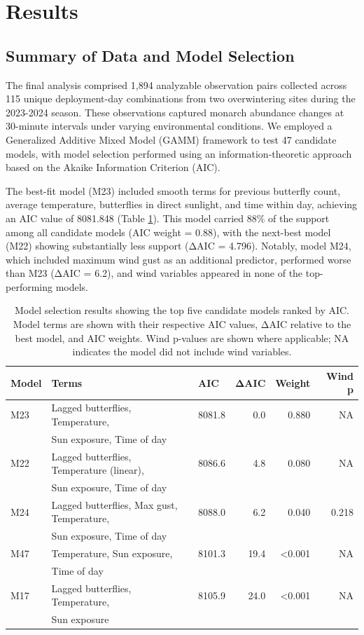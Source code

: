 \section{Results}

\subsection{Summary of Data and Model Selection}

The final analysis comprised 1,894 analyzable observation pairs collected across 115 unique deployment-day combinations from two overwintering sites during the 2023-2024 season. These observations captured monarch abundance changes at 30-minute intervals under varying environmental conditions. We employed a Generalized Additive Mixed Model (GAMM) framework to test 47 candidate models, with model selection performed using an information-theoretic approach based on the Akaike Information Criterion (AIC).

The best-fit model (M23) included smooth terms for previous butterfly count, average temperature, butterflies in direct sunlight, and time within day, achieving an AIC value of 8081.848 (Table \ref{tab:model_selection}). This model carried 88\% of the support among all candidate models (AIC weight = 0.88), with the next-best model (M22) showing substantially less support (ΔAIC = 4.796). Notably, model M24, which included maximum wind gust as an additional predictor, performed worse than M23 (ΔAIC = 6.2), and wind variables appeared in none of the top-performing models.

\begin{table}[htbp]
\centering
\caption{Model selection results showing the top five candidate models ranked by AIC. Model terms are shown with their respective AIC values, ΔAIC relative to the best model, and AIC weights. Wind p-values are shown where applicable; NA indicates the model did not include wind variables.}
\label{tab:model_selection}
\begin{tabular}{lllrrr}
\hline
Model & Terms & AIC & ΔAIC & Weight & Wind p \\
\hline
M23 & Lagged butterflies, Temperature, & 8081.8 & 0.0 & 0.880 & NA \\
    & Sun exposure, Time of day & & & & \\
M22 & Lagged butterflies, Temperature (linear), & 8086.6 & 4.8 & 0.080 & NA \\
    & Sun exposure, Time of day & & & & \\
M24 & Lagged butterflies, Max gust, Temperature, & 8088.0 & 6.2 & 0.040 & 0.218 \\
    & Sun exposure, Time of day & & & & \\
M47 & Temperature, Sun exposure, & 8101.3 & 19.4 & <0.001 & NA \\
    & Time of day & & & & \\
M17 & Lagged butterflies, Temperature, & 8105.9 & 24.0 & <0.001 & NA \\
    & Sun exposure & & & & \\
\hline
\end{tabular}
\end{table}

